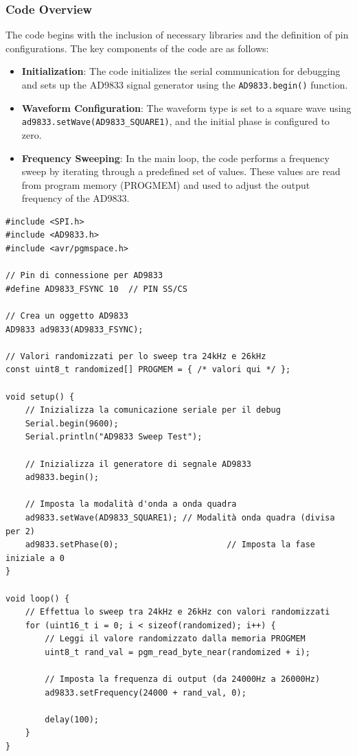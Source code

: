 \subsubsection{Code Overview}
The code begins with the inclusion of necessary libraries and the definition of pin configurations. The key components of the code are as follows:

\begin{itemize}
    \item \textbf{Initialization}: The code initializes the serial communication for debugging and sets up the AD9833 signal generator using the \texttt{AD9833.begin()} function.
    \item \textbf{Waveform Configuration}: The waveform type is set to a square wave using \texttt{ad9833.setWave(AD9833\_SQUARE1)}, and the initial phase is configured to zero.
    \item \textbf{Frequency Sweeping}: In the main loop, the code performs a frequency sweep by iterating through a predefined set of values. These values are read from program memory (PROGMEM) and used to adjust the output frequency of the AD9833.
\end{itemize}

\begin{verbatim}
#include <SPI.h>
#include <AD9833.h>
#include <avr/pgmspace.h>

// Pin di connessione per AD9833
#define AD9833_FSYNC 10  // PIN SS/CS

// Crea un oggetto AD9833
AD9833 ad9833(AD9833_FSYNC);

// Valori randomizzati per lo sweep tra 24kHz e 26kHz
const uint8_t randomized[] PROGMEM = { /* valori qui */ };

void setup() {
    // Inizializza la comunicazione seriale per il debug
    Serial.begin(9600);
    Serial.println("AD9833 Sweep Test");

    // Inizializza il generatore di segnale AD9833
    ad9833.begin();

    // Imposta la modalità d'onda a onda quadra
    ad9833.setWave(AD9833_SQUARE1); // Modalità onda quadra (divisa per 2)
    ad9833.setPhase(0);                      // Imposta la fase iniziale a 0
}

void loop() {
    // Effettua lo sweep tra 24kHz e 26kHz con valori randomizzati
    for (uint16_t i = 0; i < sizeof(randomized); i++) {
        // Leggi il valore randomizzato dalla memoria PROGMEM
        uint8_t rand_val = pgm_read_byte_near(randomized + i);
        
        // Imposta la frequenza di output (da 24000Hz a 26000Hz)
        ad9833.setFrequency(24000 + rand_val, 0);

        delay(100);
    }
}
\end{verbatim}


